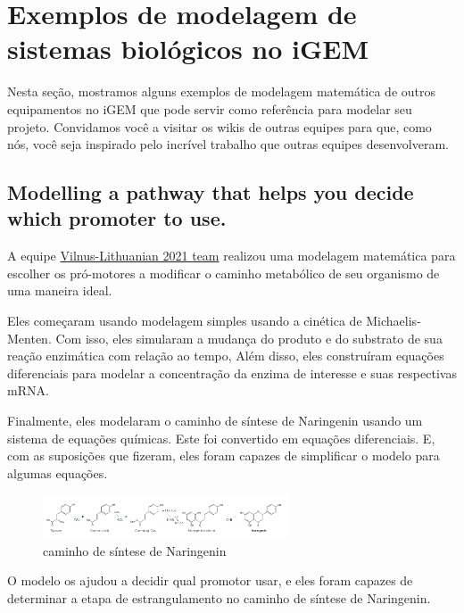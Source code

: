 \documentclass[11pt, letterpaper, portuguese]{article}
\begin{document}
  \newpage  
  


    
  

    
\newpage

\section{Exemplos de modelagem de sistemas biológicos no iGEM}
\par{Nesta seção, mostramos alguns exemplos de modelagem matemática de outros equipamentos no iGEM que pode servir como referência para modelar seu projeto. Convidamos você a visitar os wikis de outras equipes para que, como nós, você seja inspirado pelo incrível trabalho que outras equipes desenvolveram.}

    \subsection{Modelling a pathway that helps you decide which promoter to use.}
        \par{A equipe \href{https://2021.igem.org/Team:Vilnius-Lithuania/Model}{Vilnus-Lithuanian 2021 team} realizou uma modelagem matemática para escolher os pró-motores a modificar o caminho metabólico de seu organismo de uma maneira ideal.}
        \par{Eles começaram usando modelagem simples usando a cinética de Michaelis-Menten. Com isso, eles simularam a mudança do produto e do substrato de sua reação enzimática com relação ao tempo, Além disso, eles construíram equações diferenciais para modelar a concentração da enzima de interesse e suas respectivas mRNA.}
        \par{Finalmente, eles modelaram o caminho de síntese de Naringenin usando um sistema de equações químicas. Este foi convertido em equações diferenciais. E, com as suposições que fizeram, eles foram capazes de simplificar o modelo para algumas equações.}
        
        \begin{figure}
	    \centering
		\caption{caminho de síntese de Naringenin}
		\includegraphics[width=0.65\textwidth]{Vilnus.png}
	\end{figure}
	
\par{O modelo os ajudou a decidir qual promotor usar, e eles foram capazes de determinar a etapa de estrangulamento no caminho de síntese de Naringenin.}
\end{document}
